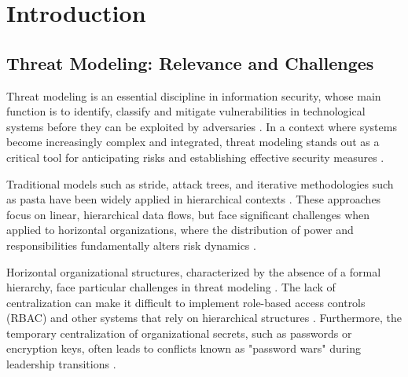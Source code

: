 
%

%

\chapter{Introduction}
\label{cha:introduction}

\section{Threat Modeling: Relevance and Challenges}
\label{sec:threat_modeling_relevance_challenges}

Threat modeling is an essential discipline in information security, whose main
function is to identify, classify and mitigate vulnerabilities in technological
systems before they can be exploited by adversaries
\cite{ThreatModelingdesigningForSecurity,
ThreatModelingASystematicLiteratureReview}. In a context where systems become
increasingly complex and integrated, threat modeling stands out as a critical
tool for anticipating risks and establishing effective security measures
\cite{DemystifyingTheThreatModelingProcess,
ThreatModelingASummaryOfAvailableMethods}.

Traditional models such as \gls{stride}, attack trees, and iterative
methodologies such as \gls{pasta} have been widely applied in hierarchical contexts
\cite{MicrosoftThreatModelingTechnique, AttackTrees, RiskCentricThreatModeling}.
These approaches focus on linear, hierarchical data flows, but face
significant challenges when applied to horizontal organizations, where the
distribution of power and responsibilities fundamentally alters risk dynamics
\cite{EvaluationofCompetingThreatModeling, Colbac}.

Horizontal organizational structures, characterized by the absence of a formal
hierarchy, face particular challenges in threat modeling \cite{Colbac}. The lack of
centralization can make it difficult to implement role-based access controls
(RBAC) and other systems that rely on hierarchical structures \cite{Colbac}. Furthermore, the
temporary centralization of organizational secrets, such as passwords or
encryption keys, often leads to conflicts known as "password wars" during
leadership transitions \cite{FromCounterpublicstoContentious}.

